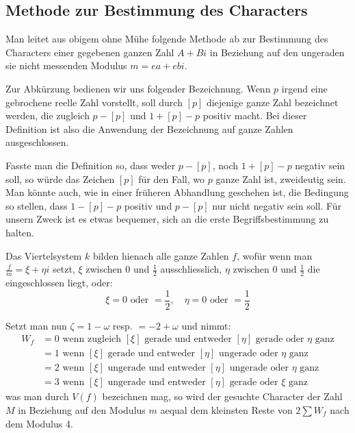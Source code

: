 \documentclass[12pt,a4paper]{article}
\begin{document}
\subsection*{Methode zur Bestimmung des Characters}

Man leitet aus obigem ohne Mühe folgende Methode ab zur Bestimmung des Characters einer gegebenen ganzen Zahl $A + Bi$ in Beziehung auf den ungeraden sie nicht messenden Modulus $m = ea + ebi$.

Zur Abkürzung bedienen wir uns folgender Bezeichnung. Wenn $p$ irgend eine gebrochene reelle Zahl vorstellt, soll durch $[p]$ diejenige ganze Zahl bezeichnet werden, die zugleich $p - [p]$ und $1 + [p] - p$ positiv macht. Bei dieser Definition ist also die Anwendung der Bezeichnung auf ganze Zahlen ausgeschlossen.

Fasste man die Definition so, dass weder $p - [p]$, noch $1 + [p] - p$ negativ sein soll, so würde das Zeichen $[p]$ für den Fall, wo $p$ ganze Zahl ist, zweideutig sein. Man könnte auch, wie in einer früheren Abhandlung geschehen ist, die Bedingung so stellen, dass $1 - [p] - p$ positiv und $p - [p]$ nur nicht negativ sein soll. Für unsern Zweck ist es etwas bequemer, sich an die erste Begriffsbestimmung zu halten.

Das Viertelsystem $k$ bilden hienach alle ganze Zahlen $f$, wofür wenn man $\frac{f}{m} = \xi + \eta i$ setzt, $\xi$ zwischen $0$ und $\frac{1}{2}$ ausschliesslich, $\eta$ zwischen $0$ und $\frac{1}{2}$ die eingeschlossen liegt, oder:
\[
\xi = 0 \text{ oder } = \frac{1}{2}, \quad \eta = 0 \text{ oder } = \frac{1}{2}
\]

Setzt man nun $\zeta = 1 - \omega$ resp. $= -2 + \omega$ und nimmt:
\begin{align*}
W_f &= 0 \text{ wenn zugleich } [\xi] \text{ gerade und entweder } [\eta] \text{ gerade oder } \eta \text{ ganz}\\
&= 1 \text{ wenn } [\xi] \text{ gerade und entweder } [\eta] \text{ ungerade oder } \eta \text{ ganz}\\
&= 2 \text{ wenn } [\xi] \text{ ungerade und entweder } [\eta] \text{ ungerade oder } \eta \text{ ganz}\\
&= 3 \text{ wenn } [\xi] \text{ ungerade und entweder } [\eta] \text{ gerade oder } \xi \text{ ganz}
\end{align*}
was man durch $V(f)$ bezeichnen mag, so wird der gesuchte Character der Zahl $M$ in Beziehung auf den Modulus $m$ aequal dem kleinsten Reste von $2\sum W_f$ nach dem Modulus 4.
\end{document}
